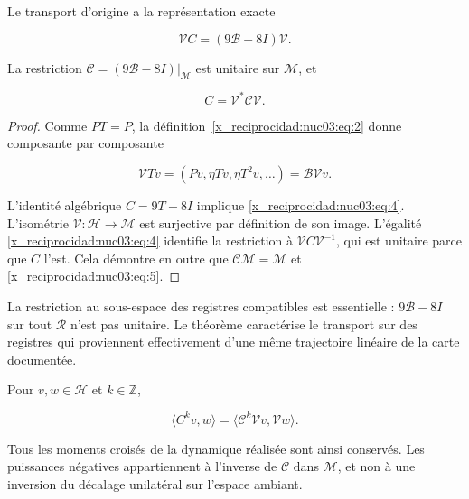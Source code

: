 \begin{theorem}
\label{x_reciprocidad:nuc03:transporte}
Le transport d’origine a la représentation exacte

\begin{equation}
\boxed{\mathcal V C=(9\mathcal B-8I)\mathcal V.}
\label{x_reciprocidad:nuc03:eq:4}
\end{equation}

La restriction \(\mathcal C=(9\mathcal B-8I)|_{\mathcal M}\) est unitaire sur \(\mathcal M\), et

\begin{equation}
C=\mathcal V^*\mathcal C\mathcal V.
\label{x_reciprocidad:nuc03:eq:5}
\end{equation}
\end{theorem}

\begin{proof}
Comme \(PT=P\), la définition~\eqref{x_reciprocidad:nuc03:eq:2} donne composante par composante

\[
\mathcal VT v=(Pv,\eta Tv,\eta T^2v,\ldots)=\mathcal B\mathcal Vv.
\]

L’identité algébrique \(C=9T-8I\) implique \eqref{x_reciprocidad:nuc03:eq:4}. L’isométrie \(\mathcal V:\mathcal H\to\mathcal M\) est surjective par définition de son image. L’égalité \eqref{x_reciprocidad:nuc03:eq:4} identifie la restriction à \(\mathcal V C\mathcal V^{-1}\), qui est unitaire parce que \(C\) l’est. Cela démontre en outre que \(\mathcal C\mathcal M=\mathcal M\) et \eqref{x_reciprocidad:nuc03:eq:5}.
\end{proof}

La restriction au sous-espace des registres compatibles est essentielle : \(9\mathcal B-8I\) sur tout \(\mathcal R\) n’est pas unitaire. Le théorème caractérise le transport sur des registres qui proviennent effectivement d’une même trajectoire linéaire de la carte documentée.

\begin{corollary}
Pour \(v,w\in\mathcal H\) et \(k\in\mathbb Z\),

\begin{equation}
\langle C^kv,w\rangle
=\langle\mathcal C^k\mathcal Vv,\mathcal Vw\rangle.
\label{x_reciprocidad:nuc03:eq:6}
\end{equation}

Tous les moments croisés de la dynamique réalisée sont ainsi conservés. Les puissances négatives appartiennent à l’inverse de \(\mathcal C\) dans \(\mathcal M\), et non à une inversion du décalage unilatéral sur l’espace ambiant.
\end{corollary}

